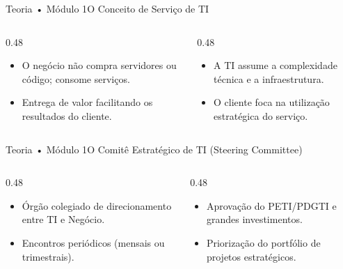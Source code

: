 \begin{senaiframe}{Teoria • Módulo 1}{O Conceito de Serviço de TI}
  \begin{columns}[t]
    \begin{column}{0.48\textwidth}
      \begin{tcolorbox}[senaibluecard, title={Visão de Serviços}]
        \begin{itemize}
          \item O negócio não compra servidores ou código; consome serviços.
          \item Entrega de valor facilitando os resultados do cliente.
        \end{itemize}
      \end{tcolorbox}
    \end{column}
    \begin{column}{0.48\textwidth}
      \begin{tcolorbox}[senaicard, title={Isolamento de Riscos}]
        \begin{itemize}
          \item A TI assume a complexidade técnica e a infraestrutura.
          \item O cliente foca na utilização estratégica do serviço.
        \end{itemize}
      \end{tcolorbox}
    \end{column}
  \end{columns}
\end{senaiframe}

\begin{senaiframe}{Teoria • Módulo 1}{O Comitê Estratégico de TI (Steering Committee)}
  \begin{columns}[t]
    \begin{column}{0.48\textwidth}
      \begin{tcolorbox}[senaibluecard, title={Instância Máxima}]
        \begin{itemize}
          \item Órgão colegiado de direcionamento entre TI e Negócio.
          \item Encontros periódicos (mensais ou trimestrais).
        \end{itemize}
      \end{tcolorbox}
    \end{column}
    \begin{column}{0.48\textwidth}
      \begin{tcolorbox}[senaigreencard, title={Atribuições Principais}]
        \begin{itemize}
          \item Aprovação do PETI/PDGTI e grandes investimentos.
          \item Priorização do portfólio de projetos estratégicos.
        \end{itemize}
      \end{tcolorbox}
    \end{column}
  \end{columns}
\end{senaiframe}

